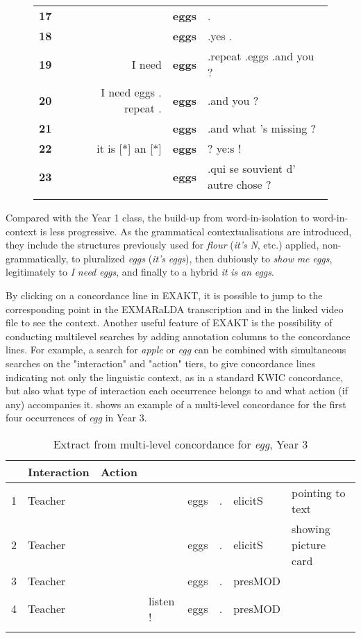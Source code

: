 \documentclass[output=paper,colorlinks,citecolor=brown,modfonts,nonflat]{../langscibook}
\begin{document}
\begin{figure}
\begin{tabular}{l@{}l@{}lr@{~}l@{~}l}
 \textbf{17} &  &  &  & \textbf{eggs} & .\\
 \textbf{18} &  &  &  & \textbf{eggs} & .yes .\\
 \textbf{19} &  &  &  I need & \textbf{eggs} & .repeat .eggs .and you ?\\
 \textbf{20} &  &  &  I need eggs . repeat . & \textbf{eggs} & .and you ?\\
 \textbf{21} &  &  &  & \textbf{eggs} & .and what 's missing ?\\
 \textbf{22} &  &  &  it is [*] an [*] & \textbf{eggs} & ? ye:s !\\
 \textbf{23} &  &  &  & \textbf{eggs} & .qui se souvient d' autre chose ?\\
\lspbottomrule
\end{tabular}
\end{figure}

Compared with the Year 1 class, the build-up from word-in-isolation to word-in-context is less progressive. As the grammatical contextualisations are introduced, they include the structures previously used for \textit{flour} (\textit{it’s} \textit{N}, etc.) applied, non-grammatically, to pluralized \textit{eggs} (\textit{it’s} \textit{eggs}), then dubiously to \textit{show} \textit{me} \textit{eggs}, legitimately to \textit{I} \textit{need} \textit{eggs}, and finally to a hybrid \textit{it} \textit{is} \textit{an} \textit{eggs}.

By clicking on a concordance line in EXAKT, it is possible to jump to the corresponding point in the EXMARaLDA transcription and in the linked video file to see the context. Another useful feature of EXAKT is the possibility of conducting multilevel searches by adding annotation columns to the concordance lines. For example, a search for \textit{apple} or \textit{egg} can be combined with simultaneous searches on the "interaction" and "action" tiers, to give concordance lines indicating not only the linguistic context, as in a standard KWIC concordance, but also what type of interaction each occurrence belongs to and what action (if any) accompanies it.  shows an example of a multi-level concordance for the first four occurrences of \textit{egg} in Year 3.

\begin{table}[t]
\caption{Extract from multi-level concordance for  {\textit{egg}},  {Year}  {3}\label{tab:hilton:5}}
\begin{tabularx}{\textwidth}{llllllXl}
\lsptoprule
\multicolumn{6}{c}{KWIC concordance} &  Interaction &  Action\\
\midrule
1 & Teacher &  &  & eggs & . & elicitS & pointing to text \\
2 & Teacher &  &  & eggs & . & elicitS & showing picture card \\
3 & Teacher &  &  & eggs & . & presMOD & \\
4 & Teacher &  & listen ! & eggs & . & presMOD & \\
\lspbottomrule
\end{tabularx}
\end{table}
\end{document}
